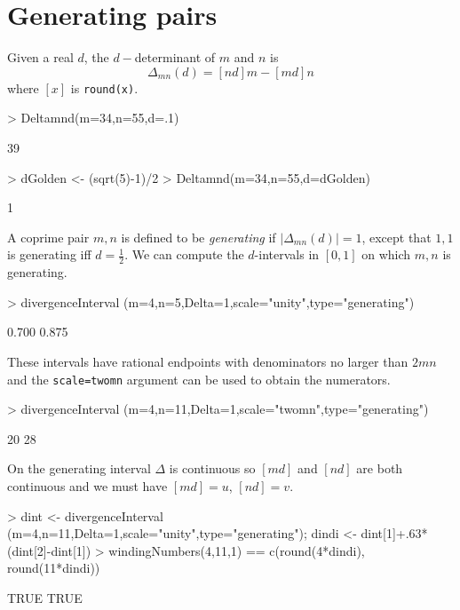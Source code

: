 \documentclass[a4paper]{article}
\newcommand{\half}{\textstyle{\frac{1}{2}}}
\begin{document}
\section{Generating pairs}
Given a real $d$, the $d-$determinant of $m$ and $n$ is
\[
\Delta_{mn}(d) =  [ nd ]  m -   [md ]n
\]
where $[x]$ is \texttt{round(x)}.
\begin{Schunk}
\begin{Sinput}
> Deltamnd(m=34,n=55,d=.1)
\end{Sinput}
\begin{Soutput}
[1] 39
\end{Soutput}
\begin{Sinput}
> dGolden <- (sqrt(5)-1)/2
> Deltamnd(m=34,n=55,d=dGolden)
\end{Sinput}
\begin{Soutput}
[1] 1
\end{Soutput}
\end{Schunk}
A coprime pair $m,n$ is defined to be \emph{generating} if $|\Delta_{mn}(d)|=1$,
except that $1,1$ is generating iff $d=\half$.
We can compute the $d$-intervals in $[0,1]$ on which $m,n$ is generating.
\begin{Schunk}
\begin{Sinput}
> divergenceInterval (m=4,n=5,Delta=1,scale="unity",type="generating")
\end{Sinput}
\begin{Soutput}
[1] 0.700 0.875
\end{Soutput}
\end{Schunk}
These intervals have rational endpoints with denominators no larger than $2mn$ and the \texttt{scale=twomn} argument can be used
to obtain the numerators.
\begin{Schunk}
\begin{Sinput}
>  divergenceInterval (m=4,n=11,Delta=1,scale="twomn",type="generating")
\end{Sinput}
\begin{Soutput}
[1] 20 28
\end{Soutput}
\end{Schunk}

On the generating interval $\Delta$ is continuous so $[md]$ and $[nd]$ are both continuous
and we must have $[md]=u$, $[nd]=v$.
\begin{Schunk}
\begin{Sinput}
> dint <- divergenceInterval (m=4,n=11,Delta=1,scale="unity",type="generating"); dindi <- dint[1]+.63*(dint[2]-dint[1])
> windingNumbers(4,11,1) == c(round(4*dindi), round(11*dindi))
\end{Sinput}
\begin{Soutput}
[1] TRUE TRUE
\end{Soutput}
\end{Schunk}
\end{document}
